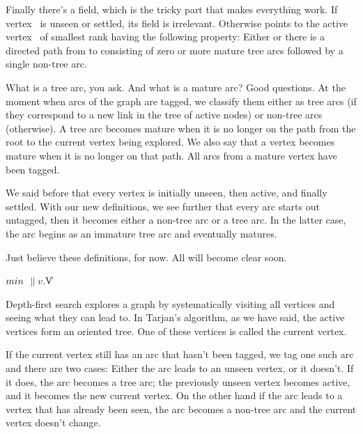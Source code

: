 Finally there's a  field, which is the tricky part that makes
everything work. If vertex~ is unseen or settled, its 
field is
irrelevant. Otherwise  points to the active vertex~
of smallest rank having the following property:
Either  or there is a directed path from  to 
consisting of
zero or more mature tree arcs followed by a single non-tree arc.

What is a tree arc, you ask. And what is a mature arc? Good questions. At the
moment when arcs of the graph are tagged, we classify them either as tree
arcs (if they correspond to a new  link in the tree of active
nodes) or non-tree arcs (otherwise). A tree arc becomes mature when it
is no longer on the path from the root to the current vertex being
explored. We also say that a vertex becomes mature when it is
no longer on that path. All arcs from a mature vertex have been tagged.

We said before that every vertex is initially unseen, then active, and
finally settled. With our new definitions, we see further that every arc starts
out untagged, then it becomes either a non-tree arc or a tree arc. In the
latter case, the arc begins as an immature tree arc and eventually matures.

Just believe these definitions, for now. All will become clear soon.

\Y\B\4\D$\\{min}$ \5
$\|v.{}$\|V\par
\fi

Depth-first search explores a graph by systematically visiting all
vertices and seeing what they can lead to. In Tarjan's algorithm, as
we have said, the active vertices form an oriented tree. One of these
vertices is called the current vertex.

If the current vertex still has an arc that hasn't been tagged, we
tag one such arc and there are two cases: Either the arc leads to
an unseen vertex, or it doesn't. If it does, the arc becomes a tree
arc; the previously unseen vertex becomes active, and it becomes the
new current vertex.  On the other hand if the arc leads to a vertex
that has already been seen, the arc becomes a non-tree arc and the
current vertex doesn't change.

